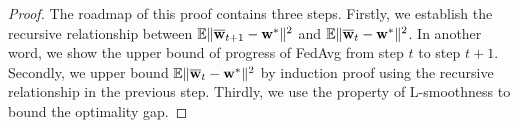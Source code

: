 \begin{proof}
	The roadmap of this proof contains three steps. Firstly, we establish the recursive relationship between $\mathbb{E}\|{\overline{\mathbf{w}}}_{t+1}-{\mathbf{w}}^{\ast}\|^{2}$
	and $\mathbb{E}\|{\overline{\mathbf{w}}}_{t}-{\mathbf{w}}^{\ast}\|^{2}$. In another word, we show the upper bound of progress of FedAvg from step $t$ to step $t+1$. 
	Secondly, we upper bound $\mathbb{E}\|{\overline{\mathbf{w}}}_{t}-{\mathbf{w}}^{\ast}\|^{2}$ by induction proof using the recursive relationship in the previous step. 
	Thirdly, we use the property of L-smoothness to bound the optimality gap. 
	

\end{proof}
